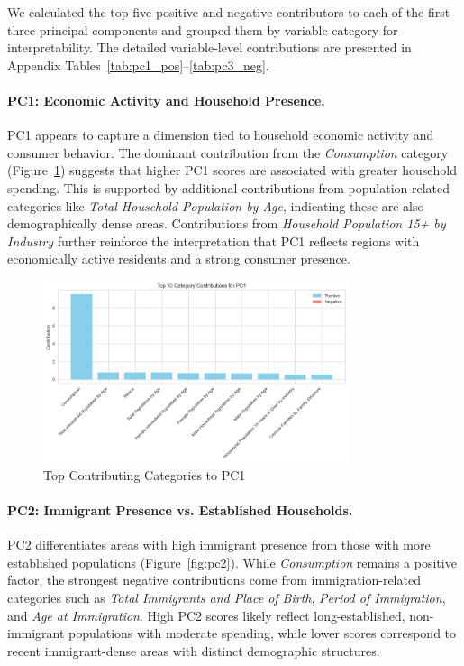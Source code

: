 \documentclass{article}
\begin{document}
We calculated the top five positive and negative contributors to each of the first three principal components and grouped them by variable category for interpretability. The detailed variable-level contributions are presented in Appendix Tables~\ref{tab:pc1_pos}--\ref{tab:pc3_neg}.

\paragraph{PC1: Economic Activity and Household Presence.}  
PC1 appears to capture a dimension tied to household economic activity and consumer behavior. The dominant contribution from the \textit{Consumption} category (Figure~\ref{fig:pc1}) suggests that higher PC1 scores are associated with greater household spending. This is supported by additional contributions from population-related categories like \textit{Total Household Population by Age}, indicating these are also demographically dense areas. Contributions from \textit{Household Population 15+ by Industry} further reinforce the interpretation that PC1 reflects regions with economically active residents and a strong consumer presence.

\begin{figure}[H]
    \centering
    \includegraphics[width=0.8\textwidth]{figures/pc1_contribs.png}
    \caption{Top Contributing Categories to PC1}
    \label{fig:pc1}
\end{figure}

\paragraph{PC2: Immigrant Presence vs. Established Households.}  
PC2 differentiates areas with high immigrant presence from those with more established populations (Figure~\ref{fig:pc2}). While \textit{Consumption} remains a positive factor, the strongest negative contributions come from immigration-related categories such as \textit{Total Immigrants and Place of Birth}, \textit{Period of Immigration}, and \textit{Age at Immigration}. High PC2 scores likely reflect long-established, non-immigrant populations with moderate spending, while lower scores correspond to recent immigrant-dense areas with distinct demographic structures.
\end{document}
